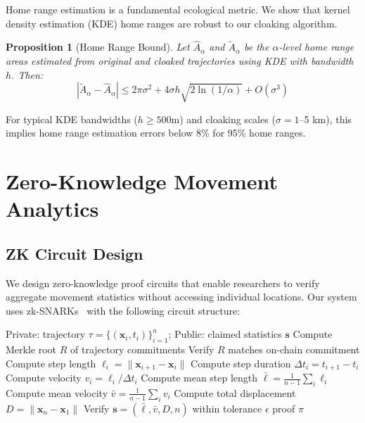 \documentclass[11pt,letterpaper]{article}
\newtheorem{proposition}[theorem]{Proposition}
\begin{document}
Home range estimation is a fundamental ecological metric. We show that kernel density estimation (KDE) home ranges are robust to our cloaking algorithm.

\begin{proposition}[Home Range Bound]
Let $\hat{A}_\alpha$ and $\tilde{A}_\alpha$ be the $\alpha$-level home range areas estimated from original and cloaked trajectories using KDE with bandwidth $h$. Then:
\begin{equation}
|\tilde{A}_\alpha - \hat{A}_\alpha| \leq 2\pi \sigma^2 + 4\sigma h \sqrt{2\ln(1/\alpha)} + O(\sigma^3)
\end{equation}
\end{proposition}

For typical KDE bandwidths ($h \geq 500$m) and cloaking scales ($\sigma = 1$--5 km), this implies home range estimation errors below 8\% for 95\% home ranges.

\section{Zero-Knowledge Movement Analytics}

\subsection{ZK Circuit Design}

We design zero-knowledge proof circuits that enable researchers to verify aggregate movement statistics without accessing individual locations. Our system uses zk-SNARKs~\cite{groth2016} with the following circuit structure:

\begin{algorithm}[htbp]
\caption{ZK-MoveStats: Zero-Knowledge Movement Statistics}
\label{alg:zkmove}
\begin{algorithmic}[1]
\REQUIRE Private: trajectory $\tau = \{(\mathbf{x}_i, t_i)\}_{i=1}^n$; Public: claimed statistics $\mathbf{s}$
\STATE Compute Merkle root $R$ of trajectory commitments
\STATE Verify $R$ matches on-chain commitment
    \STATE Compute step length $\ell_i = \|\mathbf{x}_{i+1} - \mathbf{x}_i\|$
    \STATE Compute step duration $\Delta t_i = t_{i+1} - t_i$
    \STATE Compute velocity $v_i = \ell_i / \Delta t_i$
\ENDFOR
\STATE Compute mean step length $\bar{\ell} = \frac{1}{n-1}\sum_i \ell_i$
\STATE Compute mean velocity $\bar{v} = \frac{1}{n-1}\sum_i v_i$
\STATE Compute total displacement $D = \|\mathbf{x}_n - \mathbf{x}_1\|$
\STATE Verify $\mathbf{s} = (\bar{\ell}, \bar{v}, D, n)$ within tolerance $\epsilon$
\RETURN proof $\pi$
\end{algorithmic}
\end{algorithm}
\end{document}

